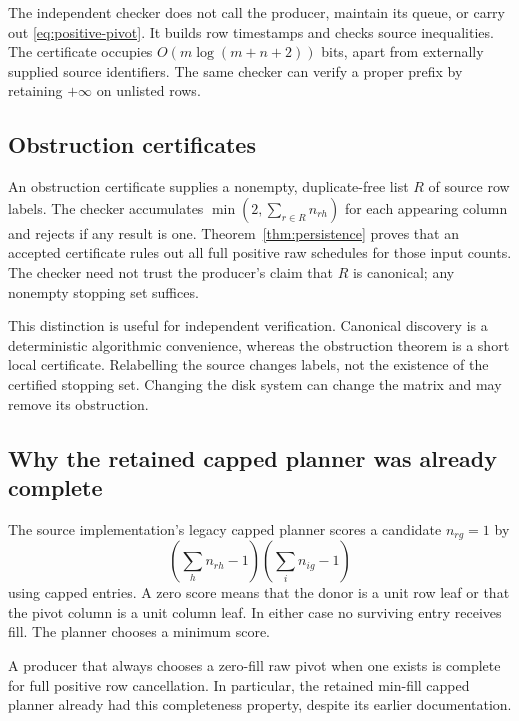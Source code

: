 The independent checker does not call the producer, maintain its queue,
or carry out \eqref{eq:positive-pivot}. It builds row timestamps and checks
source inequalities. The certificate occupies
$O(m\log(m+n+2))$ bits, apart from externally supplied source identifiers.
The same checker can verify a proper prefix by retaining $+\infty$ on
unlisted rows.

\subsection{Obstruction certificates}

An obstruction certificate supplies a nonempty, duplicate-free list $R$
of source row labels. The checker accumulates
$\min(2,\sum_{r\in R}n_{rh})$ for each appearing column and rejects if
any result is one. Theorem~\ref{thm:persistence} proves that an accepted
certificate rules out all full positive raw schedules for those input
counts. The checker need not trust the producer's claim that $R$ is
canonical; any nonempty stopping set suffices.

This distinction is useful for independent verification. Canonical discovery
is a deterministic algorithmic convenience, whereas the obstruction theorem
is a short local certificate. Relabelling the source changes labels, not
the existence of the certified stopping set. Changing the disk system can
change the matrix and may remove its obstruction.

\subsection{Why the retained capped planner was already complete}

The source implementation's legacy capped planner scores a candidate
$n_{rg}=1$ by
\[
 \left(\sum_h n_{rh}-1\right)
 \left(\sum_i n_{ig}-1\right)
\]
using capped entries. A zero score means that the donor is a unit row
leaf or that the pivot column is a unit column leaf. In either case no
surviving entry receives fill. The planner chooses a minimum score.

\begin{proposition}
\label{prop:old-complete}
A producer that always chooses a zero-fill raw pivot when one exists is
complete for full positive row cancellation. In particular, the retained
min-fill capped planner already had this completeness property, despite
its earlier documentation.
\end{proposition}

